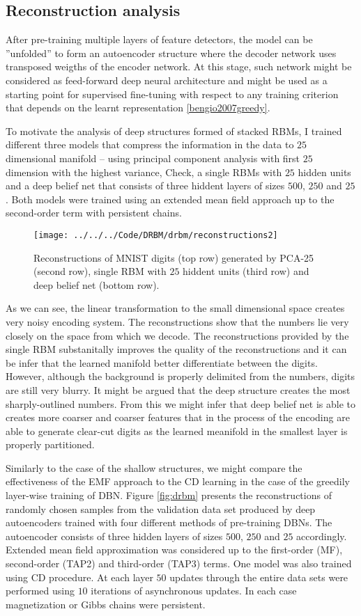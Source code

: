 \subsection{Reconstruction analysis}
After pre-training multiple layers of feature detectors, the model can be ''unfolded'' to form an autoencoder structure where the decoder network uses transposed weigths of the encoder network. At this stage, such network might be considered as feed-forward deep neural architecture and might be used as a starting point for supervised fine-tuning with respect to any training criterion that depends on the learnt representation \ref{bengio2007greedy}.

To motivate the analysis of deep structures formed of stacked RBMs, I trained different three models that compress the information in the data to $25$ dimensional manifold -- using principal component analysis with first $25$ dimension with the highest variance, Check, a single RBMs with $25$ hidden units and a deep belief net that consists of three hiddent layers of sizes $500$, $250$ and $25$. Both models were trained using an extended mean field approach up to the second-order term with persistent chains.

\begin{figure}[!htb]
\texttt{[image: ../../../Code/DRBM/drbm/reconstructions2]}
  \caption[Reconstructions of digits with basic models]{Reconstructions of MNIST digits (top row) generated by PCA-25 (second row),  single RBM with $25$ hiddent units (third row) and deep belief net (bottom row).}
  \label{fig:pca}
\end{figure}
As we can see, the linear transformation to the small dimensional space creates very noisy encoding system. The reconstructions show that the numbers lie very closely on the space from which we decode. The reconstructions provided by the single RBM substanitally improves the quality of the reconstructions and it can be infer that the learned manifold better differentiate between the digits. However, although the background is properly delimited from the numbers, digits are still very blurry. It might be argued that the deep structure creates the most sharply-outlined numbers. From this we might infer that deep belief net is able to creates more coarser and coarser features that in the process of the encoding are able to generate clear-cut digits as the learned meanifold in the smallest layer is properly partitioned.

Similarly to the case of the shallow structures, we might compare the effectiveness of the EMF approach to the CD learning in the case of the greedily layer-wise training of DBN. Figure \ref{fig:drbm} presents the reconstructions of randomly chosen samples from the validation data set produced by deep autoencoders trained with four different methods of pre-training DBNs. The autoencoder consists of three hidden layers of sizes $500$, $250$ and $25$ accordingly. Extended mean field approximation was considered up to the first-order (MF), second-order (TAP2) and third-order (TAP3) terms. One model was also trained using CD procedure. At each layer $50$ updates through the entire data sets were performed using $10$ iterations of asynchronous updates. In each case magnetization or Gibbs chains were persistent.

